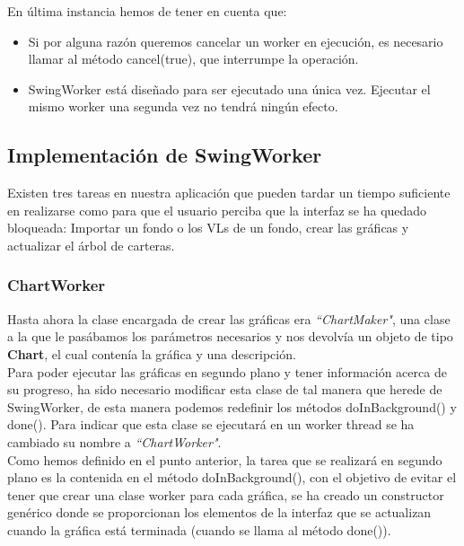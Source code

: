 \documentclass[12pt, a4paper]{article}
\begin{document}
En última instancia hemos de tener en cuenta que:

\begin{itemize}
	\item Si por alguna razón queremos cancelar un worker en ejecución, es necesario llamar al método cancel(true), que interrumpe la operación.
	\item SwingWorker está diseñado para ser ejecutado una única vez. Ejecutar el mismo worker una segunda vez no tendrá ningún efecto.
\end{itemize}


\newpage

\subsection{Implementación de SwingWorker}

Existen tres tareas en nuestra aplicación que pueden tardar un tiempo suficiente en realizarse como para que el usuario perciba que la interfaz se ha quedado bloqueada: Importar un fondo o los \gls{VL}s de un fondo, crear las gráficas y actualizar el árbol de carteras.

\subsubsection{ChartWorker}

Hasta ahora la clase encargada de crear las gráficas era \textit{``ChartMaker"}, una clase a la que le pasábamos los parámetros necesarios y nos devolvía un objeto de tipo \textbf{Chart}, el cual contenía la gráfica y una descripción.\\

Para poder ejecutar las gráficas en segundo plano y tener información acerca de su progreso, ha sido necesario modificar esta clase de tal manera que herede de SwingWorker, de esta manera podemos redefinir los métodos doInBackground() y done(). Para indicar que esta clase se ejecutará en un worker thread se ha cambiado su nombre a \textit{``ChartWorker"}. \\

Como hemos definido en el punto anterior, la tarea que se realizará en segundo plano es la contenida en el método doInBackground(), con el objetivo de evitar el tener que crear una clase worker para cada gráfica, se ha creado un constructor genérico donde se proporcionan los elementos de la interfaz que se actualizan cuando la gráfica está terminada (cuando se llama al método done()).\\
\end{document}
